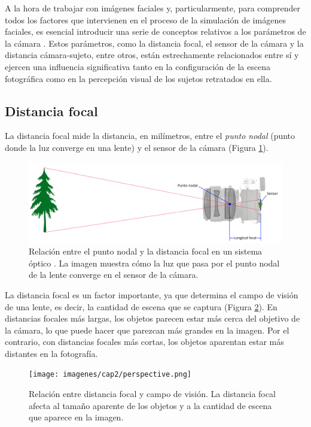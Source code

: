 A la hora de trabajar con imágenes faciales y, particularmente, para comprender todos los factores que intervienen en el proceso de la simulación de imágenes faciales, es esencial introducir una serie de conceptos relativos a los parámetros de la cámara \cite{51,67,68,69}. Estos parámetros, como la distancia focal, el sensor de la cámara y la distancia cámara-sujeto, entre otros, están estrechamente relacionados entre sí y ejercen una influencia significativa tanto en la configuración de la escena fotográfica como en la percepción visual de los sujetos retratados en ella.

\subsection*{Distancia focal}
La distancia focal mide la distancia, en milímetros, entre el \textit{punto nodal} (punto donde la luz converge en una lente) y el sensor de la cámara (Figura \ref{fig11}). 

\begin{figure}[h]
	\centering
	\includegraphics[scale=0.2]{imagenes/cap2/focal.png}
	\caption[Relación entre punto nodal y distancia focal.]{Relación entre el punto nodal y la distancia focal en un sistema óptico \cite{44}. La imagen muestra cómo la luz que pasa por el punto nodal de la lente converge en el sensor de la cámara.}
	\label{fig11}
\end{figure}

La distancia focal es un factor importante, ya que determina el campo de visión de una lente, es decir, la cantidad de escena que se captura (Figura \ref{fig11.2}).  En distancias focales más largas, los objetos parecen estar más cerca del objetivo de la cámara, lo que puede hacer que parezcan más grandes en la imagen. Por el contrario, con distancias focales más cortas, los objetos aparentan estar más distantes en la fotografía.

\begin{figure}[h]
	\centering
	\texttt{[image: imagenes/cap2/perspective.png]}
	\caption[Relación entre distancia focal y campo de visión.]{Relación entre distancia focal y campo de visión. La distancia focal afecta al tamaño aparente de los objetos y a la cantidad de escena que aparece en la imagen.}
	\label{fig11.2}
\end{figure}


